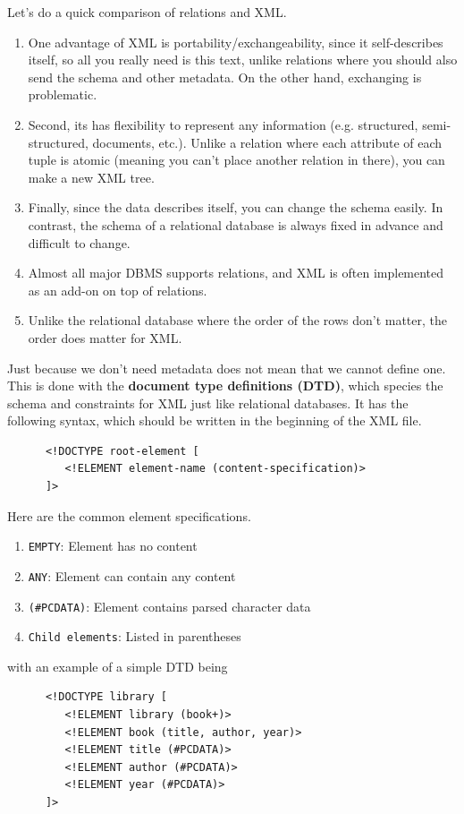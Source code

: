  Let's do a quick comparison of relations and XML. 
  \begin{enumerate}
    \item One advantage of XML is portability/exchangeability, since it self-describes itself, so all you really need is this text, unlike relations where you should also send the schema and other metadata. On the other hand, exchanging is problematic. 
    \item Second, its has flexibility to represent any information (e.g. structured, semi-structured, documents, etc.). Unlike a relation where each attribute of each tuple is atomic (meaning you can't place another relation in there), you can make a new XML tree. 
    \item Finally, since the data describes itself, you can change the schema easily. In contrast, the schema of a relational database is always fixed in advance and difficult to change. 
    \item Almost all major DBMS supports relations, and XML is often implemented as an add-on on top of relations. 
    \item Unlike the relational database where the order of the rows don't matter, the order does matter for XML. 
  \end{enumerate}
  
  \begin{definition}[DTD]
    Just because we don't need metadata does not mean that we cannot define one. This is done with the \textbf{document type definitions (DTD)}, which species the schema and constraints for XML just like relational databases. It has the following syntax, which should be written in the beginning of the XML file. 
    \begin{lstlisting}
      <!DOCTYPE root-element [
         <!ELEMENT element-name (content-specification)>
      ]> 
    \end{lstlisting} 
    Here are the common element specifications. 
    \begin{enumerate}
      \item \texttt{EMPTY}: Element has no content
      \item \texttt{ANY}: Element can contain any content
      \item \texttt{(\#PCDATA)}: Element contains parsed character data
      \item \texttt{Child elements}: Listed in parentheses
    \end{enumerate}
    with an example of a simple DTD being 
    \begin{lstlisting}
      <!DOCTYPE library [
         <!ELEMENT library (book+)>
         <!ELEMENT book (title, author, year)>
         <!ELEMENT title (#PCDATA)>
         <!ELEMENT author (#PCDATA)>
         <!ELEMENT year (#PCDATA)>
      ]> 
    \end{lstlisting}
  \end{definition}

